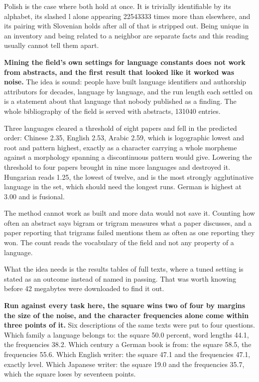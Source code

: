 Polish is the case where both hold at once. It is trivially identifiable by its alphabet, its slashed l alone appearing 22543333 times more than elsewhere, and its pairing with Slovenian holds after all of that is stripped out. Being unique in an inventory and being related to a neighbor are separate facts and this reading usually cannot tell them apart.

\textbf{Mining the field's own settings for language constants does not work from abstracts, and the first result that looked like it worked was noise.} The idea is sound: people have built language identifiers and authorship attributors for decades, language by language, and the run length each settled on is a statement about that language that nobody published as a finding. The whole bibliography of the field is served with abstracts, 131040 entries.

Three languages cleared a threshold of eight papers and fell in the predicted order: Chinese 2.35, English 2.53, Arabic 2.59, which is logographic lowest and root and pattern highest, exactly as a character carrying a whole morpheme against a morphology spanning a discontinuous pattern would give. Lowering the threshold to four papers brought in nine more languages and destroyed it. Hungarian reads 1.25, the lowest of twelve, and is the most strongly agglutinative language in the set, which should need the longest runs. German is highest at 3.00 and is fusional.

The method cannot work as built and more data would not save it. Counting how often an abstract says bigram or trigram measures what a paper discusses, and a paper reporting that trigrams failed mentions them as often as one reporting they won. The count reads the vocabulary of the field and not any property of a language.

What the idea needs is the results tables of full texts, where a tuned setting is stated as an outcome instead of named in passing. That was worth knowing before 42 megabytes were downloaded to find it out.

\textbf{Run against every task here, the square wins two of four by margins the size of the noise, and the character frequencies alone come within three points of it.} Six descriptions of the same texts were put to four questions. Which family a language belongs to: the square 50.0 percent, word lengths 44.1, the frequencies 38.2. Which century a German book is from: the square 58.5, the frequencies 55.6. Which English writer: the square 47.1 and the frequencies 47.1, exactly level. Which Japanese writer: the square 19.0 and the frequencies 35.7, which the square loses by seventeen points.

